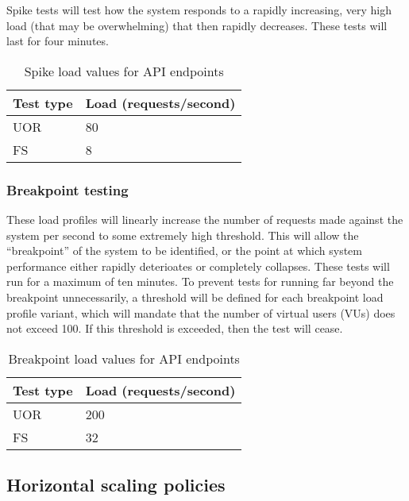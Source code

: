 Spike tests will test how the system responds to a rapidly increasing, very high load (that may be overwhelming) that then rapidly decreases. These tests will last for four minutes.

\begin{table}[h]
    \centering
    \begin{tabularx}{\textwidth}{|X|X|}
        \hline
        \textbf{Test type} & \textbf{Load (requests/second)}  \\ \hline
        UOR & 80 \\ \hline
        FS & 8 \\ \hline
    \end{tabularx}
    \caption{Spike load values for API endpoints}
    \label{table:test-spike-load-plan}
\end{table}

\subsubsection{Breakpoint testing}

These load profiles will linearly increase the number of requests made against the system per second to some extremely high threshold. This will allow the ``breakpoint'' of the system to be identified, or the point at which system performance either rapidly deterioates or completely collapses. These tests will run for a maximum of ten minutes. To prevent tests for running far beyond the breakpoint unnecessarily, a threshold will be defined for each breakpoint load profile variant, which will mandate that the number of virtual users (VUs) does not exceed 100. If this threshold is exceeded, then the test will cease.

\begin{table}[h]
    \centering
    \begin{tabularx}{\textwidth}{|X|X|}
        \hline
        \textbf{Test type} & \textbf{Load (requests/second)}  \\ \hline
        UOR & 200 \\ \hline
        FS & 32 \\ \hline
    \end{tabularx}
    \caption{Breakpoint load values for API endpoints}
    \label{table:test-breakpoint-load-plan}
\end{table}

\subsection{Horizontal scaling policies}

